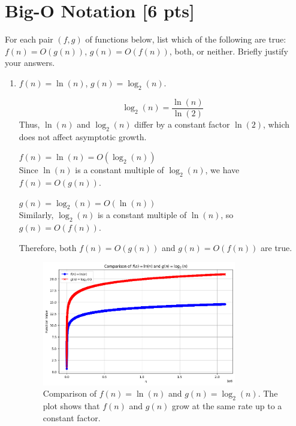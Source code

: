 \documentclass[letter]{article}
\theoremstyle{definition}
\newenvironment{soln}{
	\leavevmode\color{black}\ignorespaces
}{}
\begin{document}
\pagebreak
	\section{Big-O Notation [6 pts]}
	For each pair $(f, g)$ of functions below, list which of the following
	are true: $f(n) = O(g(n))$, $g(n) = O(f(n))$, both, or
	neither. Briefly justify your answers.
	\begin{enumerate}
		\item 	$f(n) = \ln(n)$, $g(n) = \log_{2}(n)$.\\
    		\begin{soln}
                \[
                \log_2(n) = \frac{\ln(n)}{\ln(2)}
                \]
                Thus, $\ln(n)$ and $\log_2(n)$ differ by a constant factor $\ln(2)$, which does not affect asymptotic growth.
                
                $f(n) = \ln(n) = O(\log_2(n))$\\
                
                Since $\ln(n)$ is a constant multiple of $\log_2(n)$, we have $f(n) = O(g(n))$.
                
                $g(n) = \log_2(n) = O(\ln(n))$\\
                
                Similarly, $\log_2(n)$ is a constant multiple of $\ln(n)$, so $g(n) = O(f(n))$.
                
                
                Therefore, both $f(n) = O(g(n))$ and $g(n) = O(f(n))$ are true.
                \end{soln}

                \begin{figure}[H]
                    \centering
                    \includegraphics[width=0.8\textwidth]{big-o-1.png} %
                    \caption{Comparison of $f(n) = \ln(n)$ and $g(n) = \log_{2}(n)$. The plot shows that $f(n)$ and $g(n)$ grow at the same rate up to a constant factor.}
                    \label{fig:ln_vs_log2}
                \end{figure}


\end{enumerate}
\end{document}
